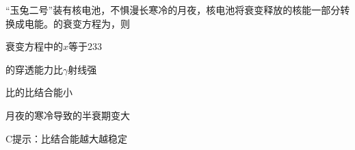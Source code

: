 “玉兔二号”装有核电池，不惧漫长寒冷的月夜，核电池将衰变释放的核能一部分转换成电能。的衰变方程为，则\paren[]
\begin{choices}
	\item 衰变方程中的\(x\)等于233
	\item {}的穿透能力比\(\gamma\)射线强
	\item {}比的比结合能小
	\item 月夜的寒冷导致的半衰期变大
\end{choices}
\begin{answer}
	C\qquad 提示：比结合能越大越稳定
\end{answer}